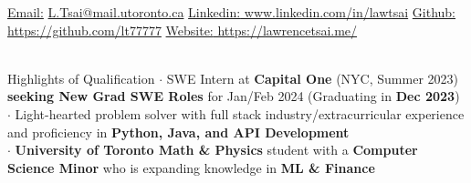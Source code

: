 \documentclass[UTF8]{resume} %
\begin{document}
  \scriptsize\underline{Email:}
            \href{L.Tsai@mail.utoronto.ca}{L.Tsai@mail.utoronto.ca}     {  }
            {\scriptsize\underline{Linkedin:}}\href{https://www.linkedin.com/in/lawtsai}{ www.linkedin.com/in/lawtsai}
            {        }
           {\scriptsize\underline{Github:}}\href{https://github.com/lt77777}{ https://github.com/lt77777}
           {        }
           {\scriptsize\underline{Website:}}\href{https://lawrencetsai.me/}{ https://lawrencetsai.me/}\\
~\vspace{-0.6cm}


\begin{rSection}{Highlights of Qualification}
    \scriptsize{
    $\cdot$ SWE Intern at \textbf{Capital One} (NYC, Summer 2023) \textbf{seeking New Grad SWE Roles} for Jan/Feb 2024 (Graduating in \textbf{Dec 2023}) \\
    $\cdot$ Light-hearted problem solver with full stack industry/extracurricular experience and proficiency in \textbf{Python, Java, and API Development}\\
    $\cdot$ \textbf{University of Toronto Math \& Physics} student with a \textbf{Computer Science Minor} who is expanding knowledge in \textbf{ML \& Finance}
    }
\end{rSection}
\end{document}
